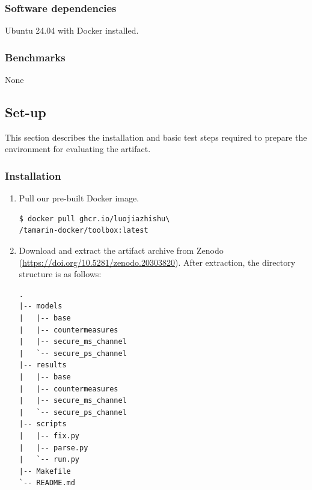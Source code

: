 \subsubsection{Software dependencies}
Ubuntu 24.04 with Docker installed. 

\subsubsection{Benchmarks}
None


\subsection{Set-up}

This section describes the installation and basic test steps required to prepare
the environment for evaluating the artifact.

\subsubsection{Installation}
\begin{enumerate}
    \item Pull our pre-built Docker image.
\begin{verbatim}
$ docker pull ghcr.io/luojiazhishu\
/tamarin-docker/toolbox:latest
\end{verbatim}
    \item Download and extract the artifact archive from Zenodo (\url{https://doi.org/10.5281/zenodo.20303820}). 
    After extraction, the directory structure is as follows:
\begin{Verbatim}[baselinestretch=0.85]
.
|-- models
|   |-- base
|   |-- countermeasures
|   |-- secure_ms_channel
|   `-- secure_ps_channel
|-- results
|   |-- base
|   |-- countermeasures
|   |-- secure_ms_channel
|   `-- secure_ps_channel
|-- scripts
|   |-- fix.py
|   |-- parse.py
|   `-- run.py
|-- Makefile
`-- README.md
\end{Verbatim}
\end{enumerate}

